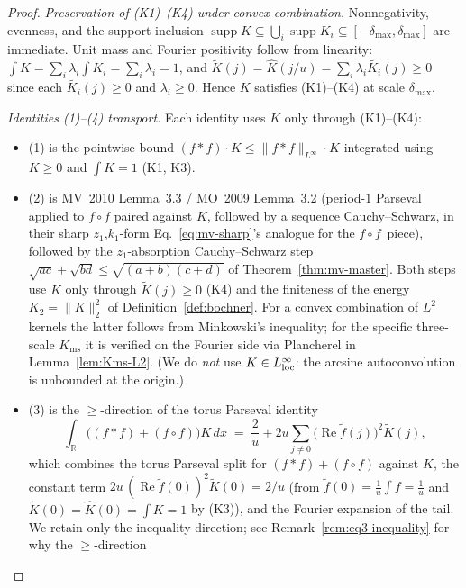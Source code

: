 \documentclass[11pt, letterpaper]{article}
\theoremstyle{paperplain}
\theoremstyle{paperdef}
\newcommand{\R}{\mathbb{R}}
\newcommand{\Linf}{L^\infty}
\newcommand{\supp}{\operatorname{supp}}
\newcommand{\Kms}{K_{\mathrm{ms}}}
\begin{document}
\begin{proof}
\emph{Preservation of (K1)--(K4) under convex combination.}
Nonnegativity, evenness, and the support inclusion
$\supp K\subseteq\bigcup_i\supp K_i\subseteq[-\delta_{\max},\delta_{\max}]$
are immediate.  Unit mass and Fourier positivity follow from linearity:
$\int K=\sum_i\lambda_i\int K_i=\sum_i\lambda_i=1$, and
$\widetilde{K}(j)=\widehat{K}(j/u)=\sum_i\lambda_i\widetilde{K_i}(j)\ge 0$
since each $\widetilde{K_i}(j)\ge 0$ and $\lambda_i\ge 0$.  Hence
$K$ satisfies (K1)--(K4) at scale $\delta_{\max}$.

\emph{Identities (1)--(4) transport.}
Each identity uses $K$ only through (K1)--(K4):
\begin{itemize}[leftmargin=2em]
\item (1) is the pointwise bound $(f*f)\cdot K\le\|f*f\|_{\Linf}\cdot K$
       integrated using $K\ge 0$ and $\int K=1$ (K1, K3).
\item (2) is MV~2010 Lemma~3.3 / MO~2009 Lemma~3.2 (period-$1$
       Parseval applied to $f\circ f$ paired against $K$, followed by
       a sequence Cauchy--Schwarz, in their sharp $z_1$,$k_1$-form
       Eq.~\eqref{eq:mv-sharp}'s analogue for the $f\circ f$~piece),
       followed by the $z_1$-absorption Cauchy--Schwarz step
       $\sqrt{ac}+\sqrt{bd}\le\sqrt{(a+b)(c+d)}$ of
       Theorem~\ref{thm:mv-master}.  Both steps use $K$ only through
       $\widetilde{K}(j)\ge 0$ (K4) and the finiteness of the energy
       $K_2=\|K\|_{2}^{2}$ of Definition~\ref{def:bochner}.  For a
       convex combination of $L^{2}$ kernels the latter follows from
       Minkowski's inequality; for the specific three-scale $\Kms$ it
       is verified on the Fourier side via Plancherel in
       Lemma~\ref{lem:Kms-L2}.  (We do \emph{not} use
       $K\in L^{\infty}_{\rm loc}$: the arcsine autoconvolution is
       unbounded at the origin.)
\item (3) is the $\ge$-direction of the torus Parseval identity
       \[
         \int_{\R}\bigl((f*f)+(f\circ f)\bigr)K\,dx
         \;=\;\frac{2}{u}+2u\sum_{j\ne 0}\bigl(\operatorname{Re}\widetilde{f}(j)\bigr)^{2}\widetilde{K}(j),
       \]
       which combines the torus Parseval split for $(f*f)+(f\circ f)$
       against $K$, the constant term
       $2u\,(\operatorname{Re}\widetilde{f}(0))^{2}\widetilde{K}(0)=2/u$
       (from $\widetilde{f}(0)=\tfrac1u\int f=\tfrac1u$ and
       $\widetilde{K}(0)=\widehat{K}(0)=\int K=1$ by (K3)), and the
       Fourier expansion of the tail.  We retain
       only the inequality direction; see
       Remark~\ref{rem:eq3-inequality} for why the $\ge$-direction

\end{itemize}
\end{proof}
\end{document}
